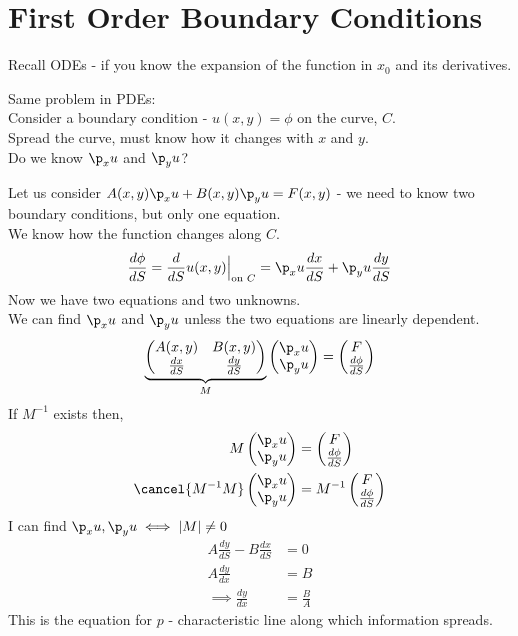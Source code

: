 \documentclass[Maths.tex]{subfiles}
\begin{document}
\section{First Order Boundary Conditions}
Recall ODEs - if you know the expansion of the function in $x_0$ and its derivatives.

Same problem in PDEs: \\
Consider a boundary condition - $u(x,y) = \phi$ on the curve, $C$. \\
Spread the curve, must know how it changes with $x$ and $y$. \\
Do we know $\p_xu$ and $\p_yu$?

Let us consider $A(x,y)\p_xu + B(x,y)\p_yu = F(x,y)$ - we need to know two boundary conditions, but only one equation.  \\
We know how the function changes along $C$.
\begin{equation}
	\frac{d\phi}{dS} = \frac{d}{dS}u(x,y)\Big|_{\text{on }C} = \p_xu\frac{dx}{dS} + \p_yu\frac{dy}{dS}
\end{equation}
Now we have two equations and two unknowns. \\
We can find $\p_xu$ and $\p_yu$ unless the two equations are linearly dependent.
\begin{equation}
	\underbrace{\begin{pmatrix} A(x,y) & B(x,y) \\ \frac{dx}{dS} & \frac{dy}{dS} \end{pmatrix}}_{M} \begin{pmatrix} \p_xu \\ \p_yu \end{pmatrix} = \begin{pmatrix} F \\ \frac{d\phi}{dS} \end{pmatrix}
\end{equation}
If $M^{-1}$ exists then,
\begin{align}
	M\begin{pmatrix} \p_xu \\ \p_yu \end{pmatrix} &= \begin{pmatrix} F \\ \frac{d\phi}{dS} \end{pmatrix} \\
	\cancel{M^{-1}M}\begin{pmatrix} \p_xu \\ \p_yu \end{pmatrix} &= M^{-1}\begin{pmatrix} F \\ \frac{d\phi}{dS} \end{pmatrix}
\end{align}
I can find $\p_xu,\p_yu \iff |M| \neq 0$
\begin{align}
	A\frac{dy}{dS} - B\frac{dx}{dS} &= 0 \\
	A\frac{dy}{dx} &= B \\
	\implies \frac{dy}{dx} &= \frac{B}{A}
\end{align}
This is the equation for $p$ - characteristic line along which information spreads.
\end{document}

